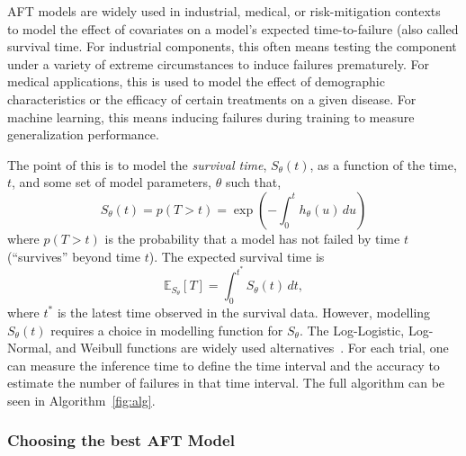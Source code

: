 \documentclass[conference]{IEEEtran}
\begin{document}
{AFT models are widely used in industrial, medical, or risk-mitigation contexts~\cite{kleinbaum1996survival, aft_models} to model the effect of covariates on a model's expected time-to-failure (also called survival time. For industrial components, this often means testing the component under a variety  of extreme circumstances to induce failures prematurely. For medical applications, this is used to model the effect of demographic characteristics or the efficacy of certain treatments on a given disease. For machine learning, this means inducing failures during training to measure generalization performance.

The point of this is to model the \textit{survival time}, $S_{\theta}(t)$, as a function of the time, $t$,  and some set of model parameters, $\theta$ such that,
$$
    S_{\theta}(t) = p(T>t) = \exp\left(-\int_0^t h_{\theta}(u) \, du\right)
$$
where $p(T>t)$ is the probability that a model has not failed by time $t$ (``survives'' beyond time $t$). The expected survival time is
\[
	\mathbb{E}_{S_\theta}[T] = \int_0^{t^*}  S_\theta(t) \,dt,
\]
where $t^*$ is the latest time observed in the survival data. However, modelling $S_{\theta}(t)$ requires a choice in modelling function for $S_{\theta}$. The Log-Logistic, Log-Normal, and Weibull functions are widely used alternatives~\cite{kleinbaum1996survival}. For each trial, one can measure the inference time to define the time interval and the accuracy to estimate the number of failures in that time interval. The full algorithm can be seen in Algorithm~\ref{fig:alg}.


\subsubsection{Choosing the best AFT Model}

}
\end{document}
